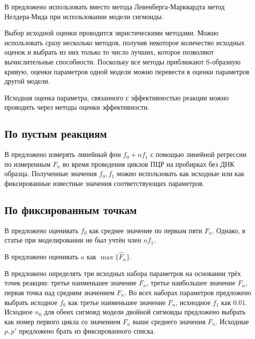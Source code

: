 В \cite{liuProgressCurveAnalysis2011, goudarRobustParameterEstimation2009}
предложено использовать вместо метода Левенберга\hyp{}Марквардта метод Нелдера-Мида
при использовании модели сигмоиды.

Выбор исходной оценки проводится эвристическими методами. Можно использовать
сразу несколько методов, получив некоторое количество исходных оценок и
выбрать из них только то число лучших, которое позволяют вычислительные
способности. Поскольку все методы приближают S-образную кривую, оценки
параметров одной модели можно перевести в оценки параметров другой модели.

Исходная оценка параметра, связанного с эффективностью реакции можно проводить
через методы оценки эффективности.

\subsection{По пустым реакциям}

В \cite{peccoudStatisticalEstimationsPCR1998} предложено измерять линейный фон
$f_0+nf_1$ с помощью линейной регрессии по измеренным $F_{n}$ во время
проведения циклов ПЦР на пробирках без ДНК образца. Полученные значения
$f_0,f_1$ можно использовать как исходные или как фиксированные известные
значения соответствующих параметров.

\subsection{По фиксированным точкам}\label{ssec:patent}

В \cite{barKineticOutlierDetection2003} предложено оценивать $f_0$ как среднее
значение по первым пяти $F_{n}$. Однако, в статье при моделировании не был
учтён член $nf_1$.

В \cite{liuProgressCurveAnalysis2011} предложено оценивать $a$ как
$\max\{\hat{F}_{n}\}$.

В \cite{kurnikPCRElbowDetermination2007,kurnikPCRElbowDetermination2011}
предложено определять три исходных набора параметров на основании трёх точек
реакции: третье наименьшее значение $F_{n}$, третье наибольшее значение
$F_{n}$, первая точка над средним значением $F_{n}$. Во всех наборах параметров
предложено выбрать исходное $f_0$ как третье наименьшее значение $F_{n}$,
исхнодное $f_1$ как $0.01$. Исходное $n_0$ для обеих сигмоид модели двойной
сигмоиды предложено выбрать как номер первого цикла со значением $F_{n}$ выше
среднего значения $F_{n}$. Исходные $p,p'$ предложено брать из фиксированного
списка.

